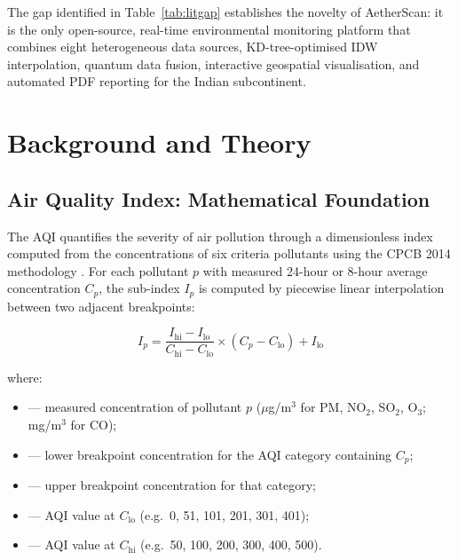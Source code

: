 \documentclass[12pt,a4paper]{article}
\begin{document}
The gap identified in Table~\ref{tab:litgap} establishes the novelty of
AetherScan: it is the only open-source, real-time environmental monitoring
platform that combines eight heterogeneous data sources, KD-tree-optimised IDW
interpolation, quantum data fusion, interactive geospatial visualisation,
and automated PDF reporting for the Indian subcontinent.

\clearpage
\section{Background and Theory}
\label{sec:background}

\subsection{Air Quality Index: Mathematical Foundation}
\label{sec:background:aqi}

The AQI quantifies the severity of air pollution through a dimensionless
index computed from the concentrations of six criteria pollutants using the
CPCB 2014 methodology \cite{cpcb2014}. For each pollutant $p$ with measured
24-hour or 8-hour average concentration $C_p$, the sub-index $I_p$ is computed
by piecewise linear interpolation between two adjacent breakpoints:

\begin{equation}
I_p = \frac{I_{\text{hi}} - I_{\text{lo}}}{C_{\text{hi}} - C_{\text{lo}}}
       \times (C_p - C_{\text{lo}}) + I_{\text{lo}}
\label{eq:aqi}
\end{equation}

\noindent where:
\begin{itemize}[leftmargin=2.5cm,label={}]
\item[$C_p$]          --- measured concentration of pollutant $p$
                          ($\mu$g/m$^3$ for PM, NO$_2$, SO$_2$, O$_3$;
                          mg/m$^3$ for CO);
\item[$C_{\text{lo}}$] --- lower breakpoint concentration for the AQI
                          category containing $C_p$;
\item[$C_{\text{hi}}$] --- upper breakpoint concentration for that category;
\item[$I_{\text{lo}}$] --- AQI value at $C_{\text{lo}}$ (e.g.\ 0, 51, 101,
                          201, 301, 401);
\item[$I_{\text{hi}}$] --- AQI value at $C_{\text{hi}}$ (e.g.\ 50, 100, 200,
                          300, 400, 500).
\end{itemize}
\end{document}
